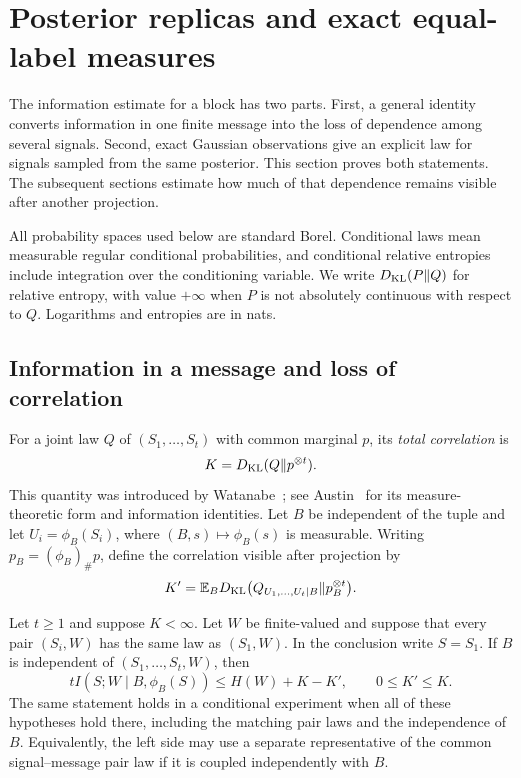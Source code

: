 \section{Posterior replicas and exact equal-label measures}
\label{sec:replicas}

The information estimate for a block has two parts. First, a general
identity converts information in one finite message into the loss of
dependence among several signals. Second, exact Gaussian observations give
an explicit law for signals sampled from the same posterior. This section
proves both statements. The subsequent sections estimate how much of that
dependence remains visible after another projection.

All probability spaces used below are standard Borel. Conditional laws mean
measurable regular conditional probabilities, and conditional relative
entropies include integration over the conditioning variable. We write
$D_{\mathrm{KL}}(P\Vert Q)$ for relative entropy, with value $+\infty$ when $P$ is
not absolutely continuous with respect to $Q$. Logarithms and entropies are
in nats.

\subsection{Information in a message and loss of correlation}

For a joint law $Q$ of $(S_1,\ldots,S_t)$ with common marginal $p$, its
\emph{total correlation} is
\[
 K=D_{\mathrm{KL}}(Q\Vert p^{\otimes t}).
\]
This quantity was introduced by Watanabe~\cite{Watanabe1960}; see
Austin~\cite[Sections 3.3 and 6]{Austin2020} for its measure-theoretic
form and information identities. Let $B$ be independent of the tuple and
let $U_i=\phi_B(S_i)$, where $(B,s)\mapsto\phi_B(s)$ is measurable.
Writing $p_B=(\phi_B)_\#p$, define the correlation visible after projection by
\[
 K'=\mathbb E_BD_{\mathrm{KL}}\bigl(Q_{U_1,\ldots,U_t\mid B}\Vert p_B^{\otimes t}\bigr).
\]

\begin{lemma}\label{lem:replica-information}
Let $t\ge1$ and suppose $K<\infty$. Let $W$ be finite-valued and suppose
that every pair $(S_i,W)$ has the same law as $(S_1,W)$. In the conclusion
write $S=S_1$. If $B$ is independent of $(S_1,\ldots,S_t,W)$, then
\begin{equation}\label{eq:replica-information}
 t I(S;W\mid B,\phi_B(S))\le H(W)+K-K',\qquad 0\le K'\le K.
\end{equation}
The same statement holds in a conditional experiment when all of these
hypotheses hold there, including the matching pair laws and the independence
of $B$. Equivalently, the left side may use a separate representative of
the common signal--message pair law if it is coupled independently with $B$.
\end{lemma}

